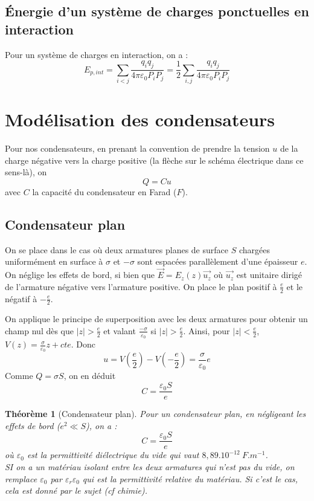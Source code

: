 \documentclass[french]{book}
\theoremstyle{plain}
\newtheorem{thm}{Théorème}
\theoremstyle{definition}
\theoremstyle{remark}
\newcommand{\inv}{^{-1}}
\begin{document}
\subsection{Énergie d'un système de charges ponctuelles en interaction}
Pour  un système de charges en interaction, on a : $$E_{p,int}=\sum_{i<j}\frac{q_iq_j}{4\pi\varepsilon_0 P_iP_j}=\frac{1}{2}\sum_{i,j}\frac{q_iq_j}{4\pi\varepsilon_0P_iP_j}$$
\section{Modélisation des condensateurs}
Pour nos condensateurs, en prenant la convention de prendre la tension $u$ de la charge négative vers la charge positive (la flèche sur le schéma électrique dans ce sens-là), on $$Q=Cu$$ avec $C$ la capacité du condensateur en Farad ($F$).
\subsection{Condensateur plan}
On se place dans le cas où deux armatures planes de surface $S$ chargées uniformément en surface à $\sigma$ et $-\sigma$ sont espacées parallèlement d'une épaisseur $e$. On néglige les effets de bord, si bien que $\overrightarrow{E}=E_z(z)\overrightarrow{u_z}$ où $\overrightarrow{u_z}$ est unitaire dirigé de l'armature négative vers l'armature positive. On place le plan positif à $\displaystyle\frac{e}{2}$ et le négatif à $-\displaystyle\frac{e}{2}$.\\ \par On applique le principe de superposition avec les deux armatures pour obtenir un champ nul dès que $\lvert z\rvert >\displaystyle\frac{e}{2}$ et valant $\displaystyle\frac{-\sigma}{\varepsilon_0}$ si $\lvert z\rvert >\displaystyle\frac{e}{2}$. Ainsi, pour $\lvert z\rvert <\displaystyle\frac{e}{2}$, $V(z)=\displaystyle\frac{\sigma}{\varepsilon_0}z+cte$. Donc $$u=V\left(\frac{e}{2}\right)-V\left(-\frac{e}{2}\right)=\frac{\sigma}{\varepsilon_0}e$$Comme $Q=\sigma S$, on en déduit $$C=\frac{\varepsilon_0 S}{e}$$
\begin{thm}[Condensateur plan]
	Pour un condensateur plan, en négligeant les effets de bord ($e^2\ll S$), on a : $$C=\frac{\varepsilon_0 S}{e}$$ où $\varepsilon_0$ est la permittivité diélectrique du vide qui vaut $8,89.10^{-12}\ F.m\inv$. \\ SI on a un matériau isolant entre les deux armatures qui n'est pas du vide, on remplace $\varepsilon_0$ par $\varepsilon_r\varepsilon_0$ qui est la permittivité relative du matériau. Si c'est le cas, cela est donné par le sujet (\textit{cf} chimie).
\end{thm}
\end{document}
